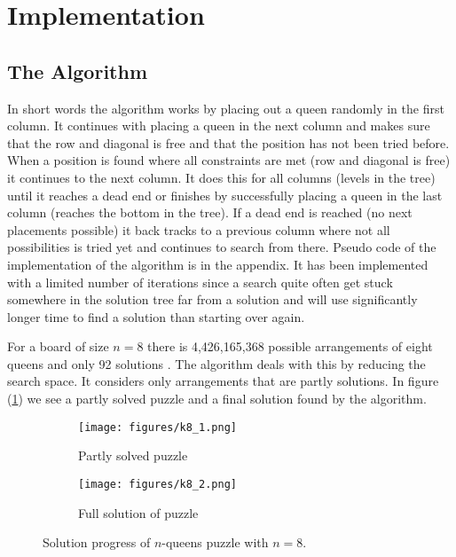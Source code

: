 \documentclass{article}
\begin{document}
\section{Implementation}

\subsection{The Algorithm}
In short words the algorithm works by placing out a queen 
randomly in the first column. %
It continues with placing
a queen in the next column and makes sure that the row and diagonal is free and that the position has
not been tried before. When a position is found where all constraints are met (row and diagonal is free) it continues to the next column. 
It does this for all columns (levels in the tree) until it reaches a dead end or
finishes by successfully placing a queen in the last column (reaches the bottom in the tree). 
If a dead end is reached (no next placements possible) it back tracks to
a previous column where not all possibilities is tried yet and continues to search from there. 
Pseudo code of the implementation of the algorithm is in the appendix. It has been implemented
with a limited number of iterations since a search quite often get stuck somewhere in the solution tree
far from a solution and will use significantly longer time to find a solution than starting over again.

For a board of size $n=8$ there is 4,426,165,368 possible arrangements of eight queens and only 92 
solutions \cite{nqueen}. The algorithm deals with this by reducing the search space. It
considers only arrangements that are partly solutions. In figure (\ref{fig:solutions}) we see
a partly solved puzzle and a final solution found by the algorithm. 


\begin{figure}[!htb]
    \begin{center}
        \begin{subfigure}[b]{0.40\textwidth}
            \texttt{[image: figures/k8\_1.png]}
            \caption{Partly solved puzzle}
        \end{subfigure}
        \begin{subfigure}[b]{0.40\textwidth}
            \texttt{[image: figures/k8\_2.png]}
            \caption{Full solution of puzzle}
        \end{subfigure}
    \end{center}
    \caption{Solution progress of $n$-queens puzzle with $n = 8$.}
    \label{fig:solutions}
\end{figure}
\end{document}

